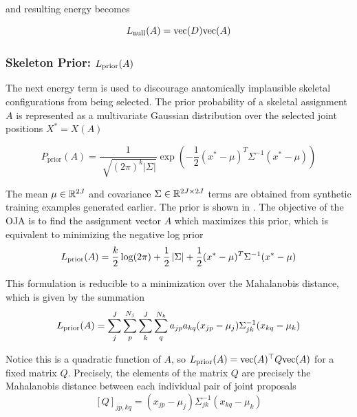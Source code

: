 and resulting energy becomes

\begin{equation}\label{eq:null-energy}
    L_{\textrm{null}}(A) = \text{vec}(D) \text{vec}(A)
\end{equation}

\subsubsection{Skeleton Prior: $L_{\textrm{prior}}(A)$}

The next energy term is used to discourage anatomically implausible skeletal configurations from being selected. The prior probability of a skeletal assignment $A$ is represented as a multivariate Gaussian distribution over the selected joint positions $X^* = X(A)$

\begin{equation}
P_{\mathrm{prior}}(A) = \frac{1}{\sqrt[]{(2\pi)^k\left|\Sigma\right|}}\exp\left(-\frac{1}{2}(x^*-\mu)^T\Sigma^{-1}(x^*-\mu)\right)
\end{equation}

The mean $\mu \in {\mathbb{R}^{2J}}$ and covariance $\Sigma \in {\mathbb{R}^{2J\times 2J}}$ terms are obtained from synthetic training examples generated earlier. The prior is shown in . The objective of the OJA is to find the assignment vector $A$ which maximizes this prior, which is equivalent to minimizing the negative log prior
\begin{equation}
    L_{\textrm{prior}}(A) = \frac{k}{2}\log(2\pi) + \frac{1}{2}\left|\Sigma\right| + \frac{1}{2}(x^*-\mu)^T\Sigma^{-1}(x^*-\mu)
\end{equation}

This formulation is reducible to a minimization over the Mahalanobis distance, which is given by the summation
\begin{equation}
L_{\textrm{prior}}(A) = \sum_j^J\sum_p^{N_j}\sum_k^J\sum_q^{N_k}a_{jp}a_{kq}(x_{jp} - \mu_j)\Sigma_{jk}^{-1}(x_{kq}-\mu_k)
\end{equation}

Notice this is a quadratic function of $A$, so $L_{\textrm{prior}}(A) = \text{vec}(A)^\top Q \text{vec}(A)$ for a fixed matrix $Q$. Precisely, the elements of the matrix $Q$ are precisely the Mahalanobis distance between each individual pair of joint proposals
\begin{equation}
\left[Q\right]_{jp, kq} = (x_{jp} - \mu_j)\Sigma_{jk}^{-1}(x_{kq}-\mu_k)
\end{equation}

